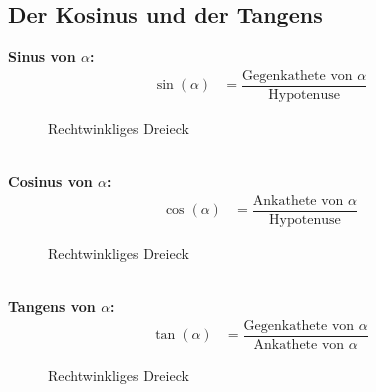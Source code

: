 \documentclass{standalone}
\begin{document}
\subsection{Der Kosinus und der Tangens}
\textbf{Sinus von $\alpha$:}
\begin{align}
  \sin(\alpha) & = \dfrac{\text{Gegenkathete von $\alpha$}}{\text{Hypotenuse}} \nonumber
\end{align}
\begin{figure}[hb!]
  \centering
  \def\svgwidth{200px}
  
  \caption{Rechtwinkliges Dreieck}
  \label{fig:rechtwinkliges_dreieck_sinus}
\end{figure}
\\
\textbf{Cosinus von $\alpha$:}
\begin{align}
  \cos(\alpha) & = \dfrac{\text{Ankathete von $\alpha$}}{\text{Hypotenuse}} \nonumber
\end{align}
\begin{figure}[hb!]
  \centering
  \def\svgwidth{200px}
  
  \caption{Rechtwinkliges Dreieck}
  \label{fig:rechtwinkliges_dreieck_cosinus}
\end{figure}
\\
\textbf{Tangens von $\alpha$:}
\begin{align}
  \tan(\alpha) & = \dfrac{\text{Gegenkathete von $\alpha$}}{\text{Ankathete von $\alpha$}} \nonumber
\end{align}
\begin{figure}[hb!]
  \centering
  \def\svgwidth{200px}
  
  \caption{Rechtwinkliges Dreieck}
  \label{fig:rechtwinkliges_dreieck_tangens}
\end{figure}
\end{document}
